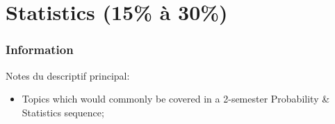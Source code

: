 \chapter[Statistics]{Statistics (15\% à 30\%)}

\subsection{Information}

\begin{distributions}[Description]
Notes du descriptif principal:
\begin{itemize}
	\item	Topics which would commonly be covered in a 2-semester Probability \& Statistics sequence;
\end{itemize}
\end{distributions}

